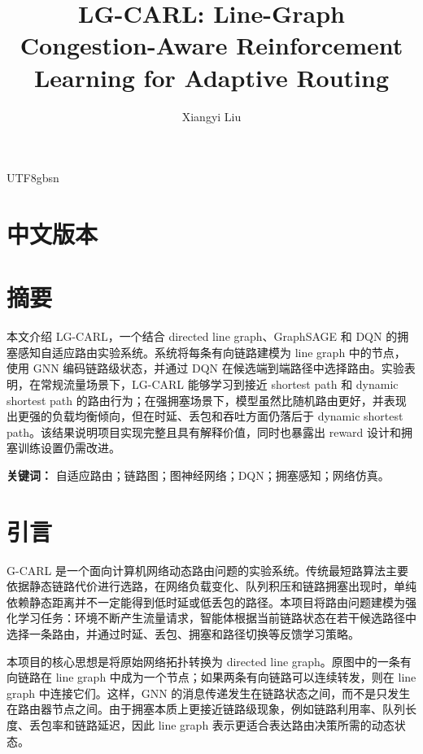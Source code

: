 \documentclass[9pt,a4paper,twocolumn,twoside]{rho-class/rho}
\title{LG-CARL: Line-Graph Congestion-Aware Reinforcement Learning for Adaptive Routing}
\author[a,1]{Xiangyi Liu}
\affil[a]{Course Project in Computer Networks and Machine Learning}
\begin{document}
\maketitle
\thispagestyle{firststyle}


\begin{CJK*}{UTF8}{gbsn}

\section*{中文版本}

\section*{摘要}

本文介绍 LG-CARL，一个结合 directed line graph、GraphSAGE 和 DQN 的拥塞感知自适应路由实验系统。系统将每条有向链路建模为 line graph 中的节点，使用 GNN 编码链路级状态，并通过 DQN 在候选端到端路径中选择路由。实验表明，在常规流量场景下，LG-CARL 能够学习到接近 shortest path 和 dynamic shortest path 的路由行为；在强拥塞场景下，模型虽然比随机路由更好，并表现出更强的负载均衡倾向，但在时延、丢包和吞吐方面仍落后于 dynamic shortest path。该结果说明项目实现完整且具有解释价值，同时也暴露出 reward 设计和拥塞训练设置仍需改进。

\textbf{关键词：} 自适应路由；链路图；图神经网络；DQN；拥塞感知；网络仿真。

\section{引言}

G-CARL 是一个面向计算机网络动态路由问题的实验系统。传统最短路算法主要依据静态链路代价进行选路，在网络负载变化、队列积压和链路拥塞出现时，单纯依赖静态距离并不一定能得到低时延或低丢包的路径。本项目将路由问题建模为强化学习任务：环境不断产生流量请求，智能体根据当前链路状态在若干候选路径中选择一条路由，并通过时延、丢包、拥塞和路径切换等反馈学习策略。

本项目的核心思想是将原始网络拓扑转换为 directed line graph。原图中的一条有向链路在 line graph 中成为一个节点；如果两条有向链路可以连续转发，则在 line graph 中连接它们。这样，GNN 的消息传递发生在链路状态之间，而不是只发生在路由器节点之间。由于拥塞本质上更接近链路级现象，例如链路利用率、队列长度、丢包率和链路延迟，因此 line graph 表示更适合表达路由决策所需的动态状态。


\end{CJK*}
\end{document}
